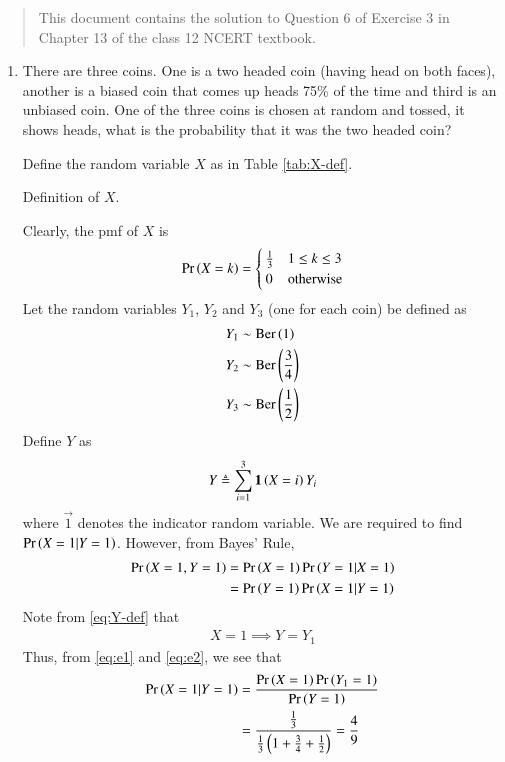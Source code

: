 \documentclass[journal,12pt,twocolumn]{IEEEtran}
\begin{document}
\begin{abstract}
    This document contains the solution to Question 6 of 
    Exercise 3 in Chapter 13 of the class 12 NCERT textbook.
\end{abstract}

\begin{enumerate}
    \item There are three coins. One is a two headed coin (having head on both 
    faces), another is a biased coin that comes up heads 75\% of the time and 
    third is an unbiased coin. One of the three coins is chosen at random and 
    tossed, it shows heads, what is the probability that it was the two headed 
    coin?

    \solution Define the random variable $X$ as in Table \ref{tab:X-def}.
    \begin{table}[!ht]
        \centering
        
        \caption{Definition of $X$.}
        \label{tab:X-def}
    \end{table}
    Clearly, the pmf of $X$ is
    \begin{align}
        \Pr\left(X=k\right) =
        \begin{cases}
            \frac{1}{3} & 1 \le k \le 3 \\
            0 & \textrm{otherwise}
        \end{cases} 
        \label{eq:X-pmf}
    \end{align}
    Let the random variables $Y_1$, $Y_2$ and $Y_3$ (one for each coin) be
    defined as
    \begin{align}
        Y_1 &\sim \textrm{Ber}\left(1\right) \label{eq:Y-1-def} \\
        Y_2 &\sim \textrm{Ber}\left(\frac{3}{4}\right) \label{eq:Y-2-def} \\
        Y_3 &\sim \textrm{Ber}\left(\frac{1}{2}\right) \label{eq:Y-3-def}
    \end{align}
    Define $Y$ as
    \begin{align}
        Y \triangleq \sum_{i=1}^3\mathbf{1}\left(X=i\right)Y_i
        \label{eq:Y-def}
    \end{align}
    where $\vec{1}$ denotes the indicator random variable. We are required
    to find $\Pr\left(X=1|Y=1\right)$. However, from Bayes' Rule,
    \begin{align}
        \Pr\left(X=1,Y=1\right) &= \Pr\left(X=1\right)\Pr\left(Y=1|X=1\right) \label{eq:e1} \\
                       &= \Pr\left(Y=1\right)\Pr\left(X=1|Y=1\right) \label{eq:e2}
    \end{align}
    Note from \eqref{eq:Y-def} that
    \begin{align}
        X=1 \implies Y=Y_1
    \end{align}
    Thus, from \eqref{eq:e1} and \eqref{eq:e2}, we see that
    \begin{align}
        \Pr\left(X=1|Y=1\right) &= \frac{\Pr\left(X=1\right)\Pr\left(Y_1=1\right)}{\Pr\left(Y=1\right)} \\
                     &= \frac{\frac{1}{3}}{\frac{1}{3}\left(1+\frac{3}{4}+\frac{1}{2}\right)} = \frac{4}{9}
    \end{align}
\end{enumerate}
\end{document}
